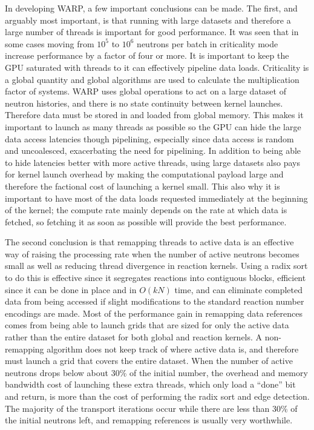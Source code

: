 In developing WARP, a few important conclusions can be made.  The first, and arguably most important, is that running with large datasets and therefore a large number of threads is important for good performance.  It was seen that in some cases moving from $10^5$ to $10^6$ neutrons per batch in criticality mode increase performance by a factor of four or more.  It is important to keep the GPU saturated with threads to it can effectively pipeline data loads.  Criticality is a global quantity and global algorithms are used to calculate the multiplication factor of systems.  WARP uses global operations to act on a large dataset of neutron histories, and there is no state continuity between kernel launches.  Therefore data must be stored in and loaded from global memory.  This makes it  important to launch as many threads as possible so the GPU can hide the large data access latencies though pipelining, especially since data access is random and uncoalesced, exacerbating the need for pipelining.  In addition to being able to hide latencies better with more active threads, using large datasets also pays for kernel launch overhead by making the computational payload large and therefore the factional cost of launching a kernel small.  This also why it is important to have most of the data loads requested immediately at the beginning of the kernel; the compute rate mainly depends on the rate at which data is fetched, so fetching it as soon as possible will provide the best performance.

The second conclusion is that remapping threads to active data is an effective way of raising the processing rate when the number of active neutrons becomes small as well as reducing thread divergence in reaction kernels.  Using a radix sort to do this is effective since it segregates reactions into contiguous blocks, efficient since it can be done in place and in $O(kN)$ time, and can eliminate completed data from being accessed if slight modifications to the standard reaction number encodings are made.  Most of the performance gain in remapping data references comes from being able to launch grids that are sized for only the active data rather than the entire dataset for both global and reaction kernels.  A non-remapping algorithm does not keep track of where active data is, and therefore must launch a grid that covers the entire dataset.  When the number of active neutrons drops below about 30\% of the initial number, the overhead and memory bandwidth cost of launching these extra threads, which only load a ``done'' bit and return, is more than the cost of performing the radix sort and edge detection.  The majority of the transport iterations occur  while there are less than 30\% of the initial neutrons left, and remapping references is usually very worthwhile.

